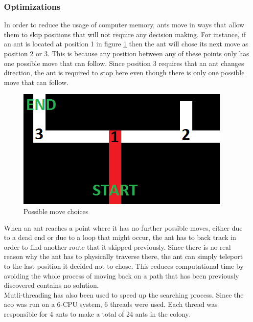\documentclass[hidelinks,english,conference]{IEEEtran}
\begin{document}
    \subsubsection{Optimizations \label{acoOptimizationSection}}
     In order to reduce the usage of computer memory, ants move in ways that allow them to skip positions that will not require any decision making. For instance, if an ant is located at position 1 in figure \ref{moveSkipImage} then the ant will chose its next move as position 2 or 3. This is because any position between any of these points only has one possible move that can follow. Since position 3 requires that an ant changes direction, the ant is required to stop here even though there is only one possible move that can follow.
    \begin{center}
        \begin{figure}
            \includegraphics[width=\linewidth]{choices.png}
            \caption{Possible move choices}
		    \label{moveSkipImage}
	    \end{figure}
    \end{center}
    
    When an ant reaches a point where it has no further possible moves, either due to a dead end or due to a loop that might occur, the ant has to back track in order to find another route that it skipped previously. Since there is no real reason why the ant has to physically traverse there, the ant can simply teleport to the last position it decided not to chose. This reduces computational time by avoiding the whole process of moving back on a path that has been previously discovered contains no solution.\\
    
    Mutli-threading has also been used to speed up the searching process. Since the \gls{aco} was run on a 6-CPU system, 6 threads were used. Each thread was responsible for 4 ants to make a total of 24 ants in the colony.\\
    
\end{document}
